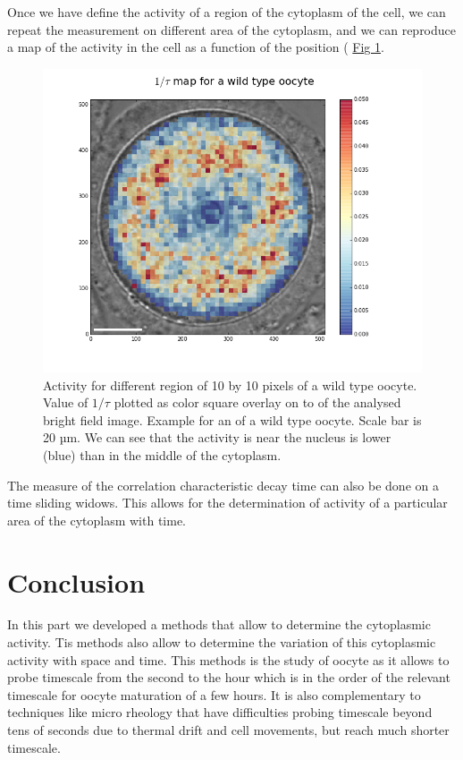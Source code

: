 \documentclass[A4paperpaper,11pt,english]{sphinxmanual}
\begin{document}
Once we have define the activity of a region of the cytoplasm of the cell, we
can repeat the measurement on different area of the cytoplasm, and we can
reproduce a map of the activity in the cell as a function of the position (
\hyperref[parts/part5:fig-activity-map]{Fig  \ref*{parts/part5:fig-activity-map}}.
\begin{figure}[htbp]
\centering
\capstart

\includegraphics[width=0.800\linewidth]{CellAct-WT.png}
\caption{Activity for different region of  10 by 10 pixels of a wild type oocyte.
Value of \(1/\tau\) plotted as color square overlay on to of the
analysed bright field image. Example for an of a wild type oocyte. Scale
bar is 20 µm. We can see that the activity is near the nucleus is lower
(blue) than in the middle of the cytoplasm.}\label{parts/part5:fig-activity-map}\end{figure}

The measure of the correlation characteristic decay time can also be done on a
time sliding widows. This allows for the determination of activity of a
particular area of the cytoplasm with time.


\section{Conclusion}
\label{parts/part5:conclusion}
In this part we developed a methods that allow to determine the cytoplasmic
activity. Tis methods also allow to determine the variation of this cytoplasmic
activity with space and time. This methods is the study of oocyte as it allows
to probe timescale from the second to the hour which is in the order of the
relevant timescale for oocyte maturation of a few hours. It is also
complementary to techniques like micro rheology that have difficulties probing
timescale beyond tens of seconds due to thermal drift and cell movements, but
reach much shorter timescale.
\end{document}
